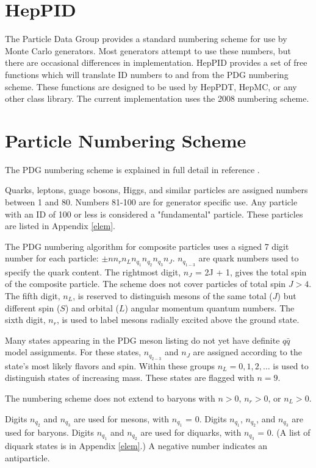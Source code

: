 
\section {HepPID}

The Particle Data Group\cite{pdg} provides a 
standard numbering scheme\cite{scheme} 
for use by Monte Carlo generators.  Most generators attempt to use these 
numbers, but there are occasional differences in implementation.  
HepPID provides a set of free functions which will translate ID numbers 
to and from the PDG numbering scheme.   These functions are designed to be 
used by HepPDT, HepMC, or any other class library.
The current implementation uses the 2008 numbering scheme.\cite{scheme}

\section { Particle Numbering Scheme }

The PDG numbering scheme is explained in full detail in reference \cite{scheme}.

Quarks, leptons, guage bosons, Higgs, and similar particles are assigned
numbers between 1 and 80.  Numbers 81-100 are for generator specific use.
Any particle with an ID of 100 or less is considered a "fundamental" particle.
These particles are listed in Appendix \ref{elem}.

The PDG numbering algorithm for composite particles uses a signed 7 
digit number for each particle:  $\pm nn_rn_Ln_{q_1}n_{q_2}n_{q_3}n_J$.
$n_{q_{1-3}}$ are quark numbers used to specify the quark content.
The rightmost digit, $n_J$ = 2J + 1, gives the total spin of the composite particle.
The scheme does not cover particles of total spin $J>4$.
The fifth digit, $n_L$, is reserved to distinguish mesons of the
same total ($J$) but different spin ($S$) and orbital ($L$)
angular momentum quantum numbers.
The sixth digit, $n_r$, is used to label mesons radially excited
above the ground state.

Many states appearing in the PDG meson listing do not yet have definite
$q\bar q$ model assignments.  For these states, $n_{q_{2-3}}$
and $n_J$ are assigned according to the state's most likely flavors
and spin.  Within these groups $n_L=0,1,2,\dots$ is used to distinguish
states of increasing mass. These states are flagged with $n=9$.

The numbering scheme does not extend to baryons with $n>0$, $n_r>0$, or $n_L>0$.

Digits $n_{q_2}$ and $n_{q_3}$ are used for mesons, with $n_{q_1}$ = 0.
Digits $n_{q_1}$, $n_{q_2}$, and $n_{q_3}$ are used for baryons.
Digits $n_{q_1}$ and $n_{q_2}$ are used for diquarks, with $n_{q_3}$ = 0. 
(A list of diquark states is in Appendix \ref{elem}.)  
A negative number indicates an antiparticle.  

